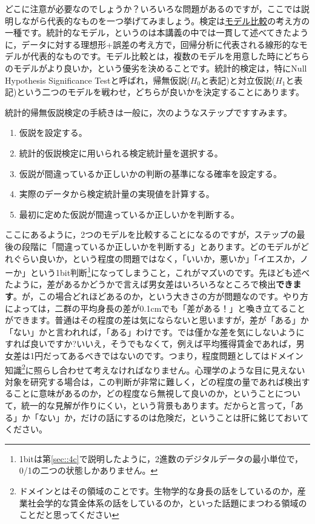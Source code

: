 \documentclass{ltjsbook}
\begin{document}
どこに注意が必要なのでしょうか？いろいろな問題があるのですが，ここでは説明しながら代表的なものを一つ挙げてみましょう。検定は\underline{モデル比較}の考え方の一種です。統計的なモデル，というのは本講義の中では一貫して述べてきたように，データに対する理想形+誤差の考え方で，回帰分析に代表される線形的なモデルが代表的なものです。モデル比較とは，複数のモデルを用意した時にどちらのモデルがより良いか，という優劣を決めることです。統計的検定は，特にNull Hypothesis Significance Testと呼ばれ，帰無仮説($H_0$と表記)と対立仮説($H_1$と表記)という二つのモデルを戦わせ，どちらが良いかを決定することにあります。

統計的帰無仮説検定の手続きは一般に，次のようなステップですすみます。
\begin{enumerate}
    \item 仮説を設定する。
    \item 統計的仮説検定に用いられる検定統計量を選択する。
    \item 仮説が間違っているか正しいかの判断の基準になる確率を設定する。
    \item 実際のデータから検定統計量の実現値を計算する。
    \item 最初に定めた仮説が間違っているか正しいかを判断する。
\end{enumerate}

ここにあるように，2つのモデルを比較することになるのですが，ステップの最後の段階に「間違っているか正しいかを判断する」とあります。どのモデルがどれぐらい良いか，という程度の問題ではなく，「いいか，悪いか」「イエスか，ノーか」という1bit判断\footnote{1bitは第\ref{sec::4c}で説明したように，2進数のデジタルデータの最小単位で，0/1の二つの状態しかありません。}になってしまうこと，これがマズいのです。先ほども述べたように，差があるかどうかで言えば男女差はいろいろなところで検出\textbf{できます}。が，この場合どれほどあるのか，という大きさの方が問題なのです。やり方によっては，二群の平均身長の差が0.1cmでも「差がある！」と喚き立てることができます。普通はその程度の差は気にならないと思いますが，差が「ある」か「ない」かと言われれば，「ある」わけです。では僅かな差を気にしないようにすれば良いですか?いいえ，そうでもなくて，例えば平均獲得賃金であれば，男女差は1円だってあるべきではないのです。つまり，程度問題としてはドメイン知識\footnote{ドメインとはその領域のことです。生物学的な身長の話をしているのか，産業社会学的な賃金体系の話をしているのか，といった話題にまつわる領域のことだと思ってください}に照らし合わせて考えなければなりません。心理学のような目に見えない対象を研究する場合は，この判断が非常に難しく，どの程度の量であれば検出することに意味があるのか，どの程度なら無視して良いのか，ということについて，統一的な見解が作りにくい，という背景もあります。だからと言って，「ある」か「ない」か，だけの話にするのは危険だ，ということは肝に銘じておいてください。
\end{document}
